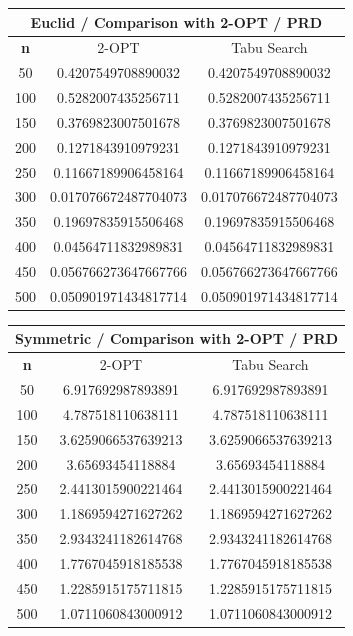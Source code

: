 \documentclass{article}
\begin{document}
\begin{center}
\begin{tabular}{|c|c|c|}
\hline
\multicolumn{3}{|c|}{\textbf{Euclid / Comparison with 2-OPT / PRD}}\\
\hline
\textbf{n} & 2-OPT & Tabu Search\\
\hline
50 & 0.4207549708890032 & 0.4207549708890032\\
\hline
100 & 0.5282007435256711 & 0.5282007435256711\\
\hline
150 & 0.3769823007501678 & 0.3769823007501678\\
\hline
200 & 0.1271843910979231 & 0.1271843910979231\\
\hline
250 & 0.11667189906458164 & 0.11667189906458164\\
\hline
300 & 0.017076672487704073 & 0.017076672487704073\\
\hline
350 & 0.19697835915506468 & 0.19697835915506468\\
\hline
400 & 0.04564711832989831 & 0.04564711832989831\\
\hline
450 & 0.056766273647667766 & 0.056766273647667766\\
\hline
500 & 0.050901971434817714 & 0.050901971434817714\\
\hline
\end{tabular}
\end{center}


\begin{center}
\begin{tabular}{|c|c|c|}
\hline
\multicolumn{3}{|c|}{\textbf{Symmetric / Comparison with 2-OPT / PRD}}\\
\hline
\textbf{n} & 2-OPT & Tabu Search\\
\hline
50 & 6.917692987893891 & 6.917692987893891\\
\hline
100 & 4.787518110638111 & 4.787518110638111\\
\hline
150 & 3.6259066537639213 & 3.6259066537639213\\
\hline
200 & 3.65693454118884 & 3.65693454118884\\
\hline
250 & 2.4413015900221464 & 2.4413015900221464\\
\hline
300 & 1.1869594271627262 & 1.1869594271627262\\
\hline
350 & 2.9343241182614768 & 2.9343241182614768\\
\hline
400 & 1.7767045918185538 & 1.7767045918185538\\
\hline
450 & 1.2285915175711815 & 1.2285915175711815\\
\hline
500 & 1.0711060843000912 & 1.0711060843000912\\
\hline
\end{tabular}
\end{center}
\end{document}
